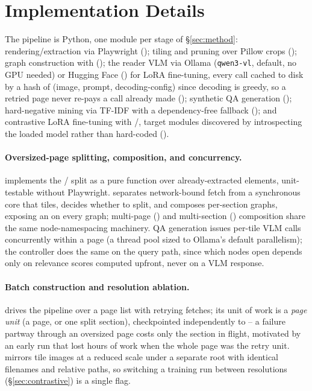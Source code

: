 \appendix

\section{Implementation Details}
\label{sec:appendix-implementation}

The pipeline is Python, one module per stage of \S\ref{sec:method}: rendering/extraction via Playwright (); tiling and pruning over Pillow crops (); graph construction with  (); the reader VLM via Ollama (\texttt{qwen3-vl}, default, no GPU needed) or Hugging Face  () for LoRA fine-tuning, every call cached to disk by a hash of (image, prompt, decoding-config) since decoding is greedy, so a retried page never re-pays a call already made (); synthetic QA generation (); hard-negative mining via  TF-IDF with a dependency-free fallback (); and contrastive LoRA fine-tuning with /, target modules discovered by introspecting the loaded model rather than hard-coded ().

\paragraph{Oversized-page splitting, composition, and concurrency.}  implements the / split as a pure function over already-extracted elements, unit-testable without Playwright.  separates network-bound fetch from a synchronous core that tiles, decides whether to split, and composes per-section graphs, exposing an  on every graph; multi-page () and multi-section () composition share the same node-namespacing machinery. QA generation issues per-tile VLM calls concurrently within a page (a thread pool sized to Ollama's default parallelism); the controller does the same on the query path, since which nodes open depends only on relevance scores computed upfront, never on a VLM response.

\paragraph{Batch construction and resolution ablation.}  drives the pipeline over a page list with retrying fetches; its unit of work is a \emph{page unit} (a page, or one split section), checkpointed independently to  -- a failure partway through an oversized page costs only the section in flight, motivated by an early run that lost hours of work when the whole page was the retry unit.  mirrors tile images at a reduced scale under a separate root with identical filenames and relative paths, so switching a training run between resolutions (\S\ref{sec:contrastive}) is a single  flag.

